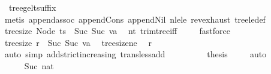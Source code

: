\begin{isabellebody}
\ {}{\isacharparenleft}{\kern0pt}{}{\isacharparenright}{\kern0pt}\ tree{\isacharunderscore}{\kern0pt}ge{\isacharunderscore}{\kern0pt}lt{\isacharunderscore}{\kern0pt}suffix\isanewline
\ \ \ \ \ \ \ \ \isamarkupfalse%
\ {\isacharparenleft}{\kern0pt}metis\ append{\isachardot}{\kern0pt}assoc\ append{\isacharunderscore}{\kern0pt}Cons\ append{\isacharunderscore}{\kern0pt}Nil\ nle{\isacharunderscore}{\kern0pt}le\ rev{\isacharunderscore}{\kern0pt}exhaust\ tree{\isacharunderscore}{\kern0pt}le{\isacharunderscore}{\kern0pt}def{\isacharparenright}{\kern0pt}\isanewline
\ \ \ \ \ \ \isamarkupfalse%
\ \isamarkupfalse%
\ {\isachardoublequoteopen}tree{\isacharunderscore}{\kern0pt}size\ {\isacharparenleft}{\kern0pt}Node\ ts{\isacharparenright}{\kern0pt}\ {\isasymge}\ Suc\ {\isacharparenleft}{\kern0pt}Suc\ va{\isacharparenright}{\kern0pt}{\isachardoublequoteclose}\ \isamarkupfalse%
\ nt{}\ trim{\isacharunderscore}{\kern0pt}tree{\isacharunderscore}{\kern0pt}{}{\isacharunderscore}{\kern0pt}iff\ \isamarkupfalse%
\ {}\ \isamarkupfalse%
\ fastforce\isanewline
\ \ \ \ \ \ \isamarkupfalse%
\ \isamarkupfalse%
\ {\isachardoublequoteopen}tree{\isacharunderscore}{\kern0pt}size\ r\ {\isachargreater}{\kern0pt}\ Suc\ {\isacharparenleft}{\kern0pt}Suc\ va{\isacharparenright}{\kern0pt}{\isachardoublequoteclose}\ \isamarkupfalse%
\ tree{\isacharunderscore}{\kern0pt}size{\isacharunderscore}{\kern0pt}ne{\isacharunderscore}{\kern0pt}{}\ \isamarkupfalse%
\ r\isanewline
\ \ \ \ \ \ \ \ \isamarkupfalse%
\ {\isacharparenleft}{\kern0pt}auto\ simp{\isacharcolon}{\kern0pt}\ add{\isacharunderscore}{\kern0pt}strict{\isacharunderscore}{\kern0pt}increasing\ trans{\isacharunderscore}{\kern0pt}less{\isacharunderscore}{\kern0pt}add{}{\isacharparenright}{\kern0pt}\isanewline
\ \ \ \ \ \ \isamarkupfalse%
\ \isamarkupfalse%
\ {\isacharquery}{\kern0pt}thesis\ \isamarkupfalse%
\ {}{\isacharparenleft}{\kern0pt}{}{\isacharparenright}{\kern0pt}\ \isamarkupfalse%
\ auto\isanewline
\ \ \ \ \isamarkupfalse%
\isanewline
\ \ \isamarkupfalse%
\isanewline
\ \ \ \ \isamarkupfalse%
\ {\isacharparenleft}{\kern0pt}Suc\ nat{\isacharparenright}{\kern0pt}\ \ \isanewline
\ \ \ \ \isamarkupfalse%
\ \isamarkupfalse%

\end{isabellebody}
